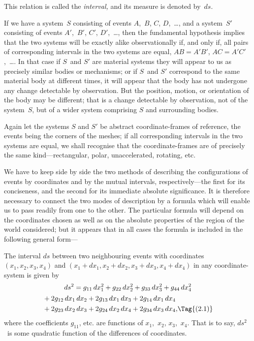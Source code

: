 \documentclass[12pt]{book}
\begin{document}
This relation is called the \emph{interval,} and its measure is denoted by~$ds$.%
%

If we have a system~$S$ consisting of events $A$,~$B$, $C$, $D$,~\dots, and a system~$S'$
consisting of events $A'$,~$B'$, $C'$, $D'$,~\dots, then the fundamental hypothesis implies
that the two systems will be exactly alike observationally if, and only if, all
pairs of corresponding intervals in the two systems are equal, $AB = A'B'$,
$AC = A'C'$,~\dots. In that case if $S$~and $S'$ are material systems they will appear
to us as precisely similar bodies or mechanisms; or if $S$~and $S'$ correspond to
the same material body at different times, it will appear that the body has
not undergone any change detectable by observation. But the position,
motion, or orientation of the body may be different; that is a change detectable
by observation, not of the system~$S$, but of a wider system comprising $S$
and surrounding bodies.

Again let the systems $S$ and $S'$ be abstract coordinate\hyp{}frames of reference,
the events being the corners of the meshes; if all corresponding intervals in
the two systems are equal, we shall recognise that the coordinate\hyp{}frames are
of precisely the same kind---rectangular, polar, unaccelerated, rotating, etc.


We have to keep side by side the two methods of describing the configurations
of events by coordinates and by the mutual intervals, respectively---the
first for its conciseness, and the second for its immediate absolute
significance. It is therefore necessary to connect the two modes of description
by a formula which will enable us to pass readily from one to the other. The
particular formula will depend on the coordinates chosen as well as on the
absolute properties of the region of the world considered; but it appears that
in all cases the formula is included in the following general form---

The interval $ds$ between two neighbouring events with coordinates
%
$(x_1, x_2, x_3, x_4)$ and $(x_1 + dx_1, x_2 + dx_2, x_3 + dx_3, x_4 + dx_4)$ in any coordinate\hyp{}system
is given by
\begin{multline*}
  ds^2 = g_{11}\, dx_1^2 + g_{22}\, dx_2^2 + g_{33}\, dx_3^2 + g_{44}\, dx_4^2 \\
  \begin{aligned}[b]
    &+ 2g_{12}\, dx_1\, dx_2 + 2g_{13}\, dx_1\, dx_3 + 2g_{14}\, dx_1\, dx_4 \\
    &+ 2g_{23}\, dx_2\, dx_3 + 2g_{24}\, dx_2\, dx_4 + 2g_{34}\, dx_3\, dx_4,
  \end{aligned}
\Tag{(2.1)}
\end{multline*}
where the coefficients $g_{11}$, etc. are functions of $x_1$,~$x_2$, $x_3$,~$x_4$. That is to say,
$ds^2$~is some quadratic function of the differences of coordinates.
\end{document}
